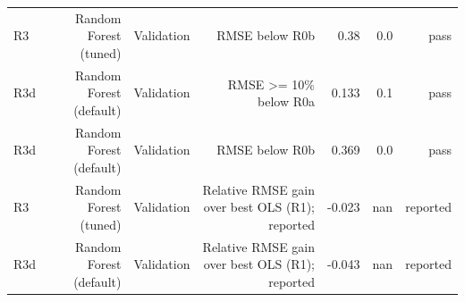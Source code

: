 \begin{table}[htbp]
\begin{tabular}{lrrrrrr}
R3 & Random Forest (tuned) & Validation & RMSE below R0b & 0.38 & 0.0 & pass \\
R3d & Random Forest (default) & Validation & RMSE >= 10\% below R0a & 0.133 & 0.1 & pass \\
R3d & Random Forest (default) & Validation & RMSE below R0b & 0.369 & 0.0 & pass \\
R3 & Random Forest (tuned) & Validation & Relative RMSE gain over best OLS (R1); reported & -0.023 & nan & reported \\
R3d & Random Forest (default) & Validation & Relative RMSE gain over best OLS (R1); reported & -0.043 & nan & reported \\
\bottomrule
\end{tabular}
\par\smallskip\begin{minipage}{\linewidth}\footnotesize \end{minipage}
\end{table}


